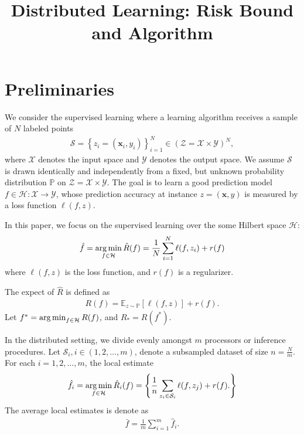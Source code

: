 \documentclass{article}
\title{Distributed Learning: Risk Bound and Algorithm}
\author{
}
\newcommand{\argmin}{\operatornamewithlimits{arg\,min}}
\begin{document}

\maketitle

\begin{abstract}

\end{abstract}

\section{Preliminaries}
We consider  the supervised learning where a learning algorithm receives a sample of $N$ labeled points
\begin{align*}
  \mathcal{S}=\left\{z_i=(\mathbf  x_i,y_i)\right\}_{i=1}^N
        \in (\mathcal{Z}=\mathcal{X}\times \mathcal{Y})^N,
\end{align*}
where $\mathcal{X}$ denotes the input space and
$\mathcal{Y}$ denotes the output space.
We assume $\mathcal{S}$ is drawn identically and independently from a fixed,
but unknown probability  distribution $\mathbb{P}$ on
$\mathcal{Z}=\mathcal{X}\times\mathcal{Y}$.
The goal is to learn a good prediction model $f\in\mathcal{H}:\mathcal{X}\rightarrow\mathcal{Y}$,
whose prediction accuracy at instance
$z=(\mathbf x,y)$ is measured by a loss function $\ell(f,z)$.

In this paper, we focus on the supervised learning over the some Hilbert space $\mathcal{H}$:
\begin{align}
  \hat{f}=\argmin_{f\in\mathcal{H}} \hat{R}(f)=\frac{1}{N}\sum_{i=1}^N\ell(f,z_i)+r(f)
\end{align}
where $\ell(f,z)$ is the loss function, and $r(f)$ is a regularizer.

The expect of $\hat{R}$ is defined as
\begin{align}
  R(f)=\mathbb{E}_{z\sim \mathbb{P}}[\ell(f,z)]+ r(f).
\end{align}
Let $f^\ast=\argmin_{f\in\mathcal{H}} R(f)$,  and $R_\ast=R(f^\ast)$.

In the distributed setting, we divide evenly amongst $m$ processors or inference procedures.
Let $\mathcal{S}_i, i\in(1,2,\ldots,m)$, denote a subsampled dataset of size $n=\frac{N}{m}$.
For each $i=1,2,\ldots,m$, the local estimate
\begin{align*}
  \hat{f}_i=\argmin_{f\in\mathcal{H}}\hat{R}_i(f)=
  \left\{
    \frac{1}{n}\sum_{z_i\in\mathcal{S}_i}\ell(f,z_j)+r(f).
  \right\}
\end{align*}
The average local estimates is denote as
\begin{align*}
  \bar{f}=\frac{1}{m}\sum_{i=1}^m\hat{f}_i.
\end{align*}
\end{document}
